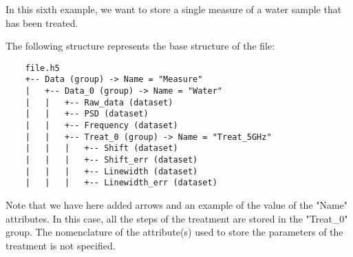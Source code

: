 In this sixth example, we want to store a single measure of a water sample that has been treated.

The following structure represents the base structure of the file:
\begin{verbatim}
    file.h5
    +-- Data (group) -> Name = "Measure"
    |   +-- Data_0 (group) -> Name = "Water"
    |   |   +-- Raw_data (dataset)
    |   |   +-- PSD (dataset)
    |   |   +-- Frequency (dataset)
    |   |   +-- Treat_0 (group) -> Name = "Treat_5GHz"
    |   |   |   +-- Shift (dataset)
    |   |   |   +-- Shift_err (dataset)
    |   |   |   +-- Linewidth (dataset)
    |   |   |   +-- Linewidth_err (dataset)
\end{verbatim}
Note that we have here added arrows and an example of the value of the "Name" attributes.
In this case, all the steps of the treatment are stored in the "Treat\_0" group. The nomenclature of the attribute(s) used to store the parameters of the treatment is not specified.